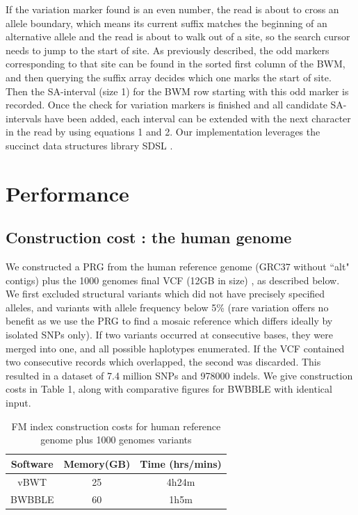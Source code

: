 \documentclass[runningheads,a4paper]{llncs}
\begin{document}
If the variation marker found is an even number, the read is about to cross an allele boundary, which means its current suffix matches the beginning of an alternative allele and the read is about to walk out of a site, so the search cursor needs to jump to the start of site. As previously described, the odd markers corresponding to that site can be found in the sorted first column of the BWM, and then querying the suffix array decides which one marks the start of site. Then the SA-interval (size 1) for the BWM row starting with this odd marker is recorded.
Once the check for variation markers is finished and all candidate SA-intervals have been added, each interval can be extended with the next character in the read by using equations 1 and 2. Our implementation leverages the succinct data structures library SDSL \cite{gog}.




\section{Performance}
\subsection{Construction cost : the human genome}
We   constructed a PRG from the human reference genome (GRC37 without ``alt" contigs) plus the 1000 genomes final VCF (12GB in size) \cite{1000g}, as described below. We first  excluded structural variants which did not have precisely specified alleles, and variants with allele frequency below 5\% (rare variation offers no benefit as we use the PRG to find a mosaic reference which differs ideally by isolated SNPs only). If two variants occurred at consecutive bases, they were merged into one, and all possible haplotypes enumerated. If the VCF contained two consecutive records which overlapped, the second was discarded. This resulted in a dataset of 7.4 million SNPs and 978000 indels. We give construction costs in Table 1, along with comparative figures for BWBBLE with identical input. 
 
\begin{table}
\caption{FM index construction costs for human reference genome plus 1000 genomes variants}
\centering
\begin{tabular}{c c c}
\hline
Software  & Memory(GB) & Time (hrs/mins)\\
\hline
vBWT  & 25  & 4h24m \\
BWBBLE  & 60 &  1h5m \\ 
\hline
\end{tabular}
\end{table}
\end{document}
